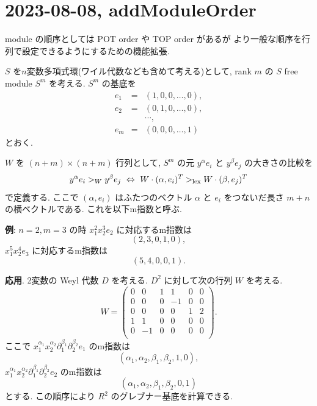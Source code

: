 \documentclass{jarticle}
\def\pd#1{\partial_{#1}}
\begin{document}
\section{2023-08-08, addModuleOrder}

module の順序としては POT order や TOP order があるが
より一般な順序を行列で設定できるようにするための機能拡張.

$S$ を$n$変数多項式環(ワイル代数なども含めて考える)として,
rank $m$ の $S$ free module $S^m$ を考える.
$S^m$ の基底を
\begin{eqnarray*}
e_1 &=& (1,0,0,\ldots,0), \\
e_2 &=& (0,1,0,\ldots,0), \\
    & & \cdots, \\
e_m &=& (0,0,0,\ldots,1)
\end{eqnarray*}
とおく.

$W$ を $(n+m) \times (n+m)$ 行列として,
$S^m$ の元 $y^\alpha e_i$ と $y^\beta e_j$ の大きさの比較を
\begin{equation}
y^\alpha e_i >_W y^\beta e_j \ 
\Leftrightarrow \ 
W \cdot (\alpha,e_i)^T >_{\rm lex} W \cdot (\beta,e_j)^T  
\end{equation}
で定義する.
ここで $(\alpha,e_i)$ はふたつのベクトル $\alpha$ と $e_i$ をつないだ長さ
$m+n$ の横ベクトルである. これを以下m指数と呼ぶ.

\noindent
{\bf 例}:
$n=2, m=3$ の時 $x_1^2 x_2^3 e_2$ に対応するm指数は
$$ (2,3,0,1,0), $$
$x_1^5 x_2^4 e_3$ に対応するm指数は
$$ (5,4,0,0,1). $$

\bigbreak
\noindent
{\bf 応用}.
2変数の Weyl 代数 $D$ を考える.
$D^2$ に対して次の行列 $W$ を考える.
$$ W=
\left(
\begin{array}{cccccc}
 0 & 0 & 1 & 1 & 0 & 0 \\
 0 & 0 & 0 & -1 & 0 & 0 \\
 0 & 0 & 0 & 0 & 1 & 2 \\
 1 & 1 & 0 & 0 & 0 & 0 \\
 0 & -1 & 0 & 0 & 0 & 0 \\
\end{array}
\right).
$$
ここで
$x_1^{\alpha_1} x_2^{\alpha_2} \pd{1}^{\beta_1} \pd{2}^{\beta_2} e_1$
のm指数は
$$ (\alpha_1,\alpha_2,\beta_1,\beta_2,1,0), $$
$x_1^{\alpha_1} x_2^{\alpha_2} \pd{1}^{\beta_1} \pd{2}^{\beta_2} e_2$
のm指数は
$$ (\alpha_1,\alpha_2,\beta_1,\beta_2,0,1) $$
とする.
この順序により $R^2$ のグレブナー基底を計算できる.
\end{document}

